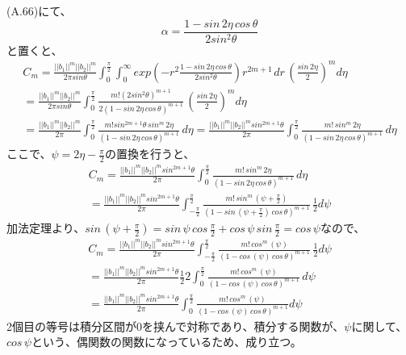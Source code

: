 \documentclass{jsarticle}
\begin{document}
(A.66)にて、
\begin{equation}
\alpha = \frac{ 1- sin\,2\eta \,cos\,\theta}{2sin^2\theta}
\end{equation}
と置くと、
\begin{equation}
\begin{split}
C_m 
= \frac{||b_1||^m ||b_2||^m }{2\pi{sin\theta}} \int_{0}^{\frac{\pi}{2}} \int_{0}^{\infty} exp(-r^2\frac{ 1- sin\,2\eta \,cos\,\theta}{2sin^2\theta}) r^{2m+1\,}dr \, (\frac{sin\,2\eta}{2})^m d\eta\\
= \frac{||b_1||^m ||b_2||^m }{2\pi{sin\theta}} \int_{0}^{\frac{\pi}{2}} \frac{m!(2sin^2\theta)^{m+1}}{2(1- sin\,2\eta \,cos\,\theta)^{m+1}} \, (\frac{sin\,2\eta}{2})^m d\eta\\
= \frac{||b_1||^m ||b_2||^m }{2\pi} \int_{0}^{\frac{\pi}{2}} \frac{m! sin^{2m+1}\theta\,sin^{m}\,2\eta}{(1- sin\,2\eta \,cos\,\theta)^{m+1}} \, d\eta
= \frac{||b_1||^m ||b_2||^m  sin^{2m+1}\theta}{2\pi} \int_{0}^{\frac{\pi}{2}} \frac{m!\,sin^{m}\,2\eta}{(1- sin\,2\eta \,cos\,\theta)^{m+1}} \, d\eta
\end{split}
\end{equation}
ここで、$\psi = 2\eta -\frac{\pi}{2}$の置換を行うと、
\begin{equation}
\begin{split}
C_m 
= \frac{||b_1||^m ||b_2||^m  sin^{2m+1}\theta}{2\pi} \int_{0}^{\frac{\pi}{2}} \frac{m!\,sin^{m}\,2\eta}{(1- sin\,2\eta \,cos\,\theta)^{m+1}} \, d\eta\\
= \frac{||b_1||^m ||b_2||^m  sin^{2m+1}\theta}{2\pi} \int_{-\frac{\pi}{2}}^{\frac{\pi}{2}} \frac{m!\,sin^{m}\,(\psi+\frac{\pi}{2})}{(1- sin\,(\psi+\frac{\pi}{2}) \,cos\,\theta)^{m+1}} \, \frac{1}{2}d\psi
\end{split}
\end{equation}
加法定理より、$sin\,(\psi+\frac{\pi}{2}) = sin\,\psi\,cos\,\frac{\pi}{2} + cos\,\psi\,sin\,\frac{\pi}{2} = cos\,\psi$なので、
\begin{equation}
\begin{split}
C_m 
= \frac{||b_1||^m ||b_2||^m  sin^{2m+1}\theta}{2\pi} \int_{-\frac{\pi}{2}}^{\frac{\pi}{2}} \frac{m!\,cos^{m}\,(\psi)}{(1- cos\,(\psi) \,cos\,\theta)^{m+1}} \, \frac{1}{2}d\psi\\
= \frac{||b_1||^m ||b_2||^m  sin^{2m+1}\theta}{2\pi} \frac{1}{2} 2\int_{0}^{\frac{\pi}{2}} \frac{m!\,cos^{m}\,(\psi)}{(1- cos\,(\psi) \,cos\,\theta)^{m+1}} \, d\psi\\
= \frac{||b_1||^m ||b_2||^m  sin^{2m+1}\theta}{2\pi} \int_{0}^{\frac{\pi}{2}} \frac{m!\,cos^{m}\,(\psi)}{(1- cos\,(\psi) \,cos\,\theta)^{m+1}} d\psi
\end{split}
\end{equation}
2個目の等号は積分区間が0を挟んで対称であり、積分する関数が、$\psi$に関して、$cos\,\psi$という、偶関数の関数になっているため、成り立つ。
\end{document}
